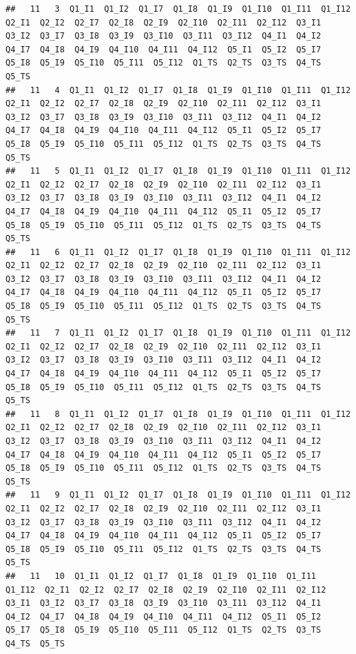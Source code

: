 \documentclass[
]{book}
\begin{document}
\begin{verbatim}
##   11   3  Q1_I1  Q1_I2  Q1_I7  Q1_I8  Q1_I9  Q1_I10  Q1_I11  Q1_I12  Q2_I1  Q2_I2  Q2_I7  Q2_I8  Q2_I9  Q2_I10  Q2_I11  Q2_I12  Q3_I1  Q3_I2  Q3_I7  Q3_I8  Q3_I9  Q3_I10  Q3_I11  Q3_I12  Q4_I1  Q4_I2  Q4_I7  Q4_I8  Q4_I9  Q4_I10  Q4_I11  Q4_I12  Q5_I1  Q5_I2  Q5_I7  Q5_I8  Q5_I9  Q5_I10  Q5_I11  Q5_I12  Q1_TS  Q2_TS  Q3_TS  Q4_TS  Q5_TS
##   11   4  Q1_I1  Q1_I2  Q1_I7  Q1_I8  Q1_I9  Q1_I10  Q1_I11  Q1_I12  Q2_I1  Q2_I2  Q2_I7  Q2_I8  Q2_I9  Q2_I10  Q2_I11  Q2_I12  Q3_I1  Q3_I2  Q3_I7  Q3_I8  Q3_I9  Q3_I10  Q3_I11  Q3_I12  Q4_I1  Q4_I2  Q4_I7  Q4_I8  Q4_I9  Q4_I10  Q4_I11  Q4_I12  Q5_I1  Q5_I2  Q5_I7  Q5_I8  Q5_I9  Q5_I10  Q5_I11  Q5_I12  Q1_TS  Q2_TS  Q3_TS  Q4_TS  Q5_TS
##   11   5  Q1_I1  Q1_I2  Q1_I7  Q1_I8  Q1_I9  Q1_I10  Q1_I11  Q1_I12  Q2_I1  Q2_I2  Q2_I7  Q2_I8  Q2_I9  Q2_I10  Q2_I11  Q2_I12  Q3_I1  Q3_I2  Q3_I7  Q3_I8  Q3_I9  Q3_I10  Q3_I11  Q3_I12  Q4_I1  Q4_I2  Q4_I7  Q4_I8  Q4_I9  Q4_I10  Q4_I11  Q4_I12  Q5_I1  Q5_I2  Q5_I7  Q5_I8  Q5_I9  Q5_I10  Q5_I11  Q5_I12  Q1_TS  Q2_TS  Q3_TS  Q4_TS  Q5_TS
##   11   6  Q1_I1  Q1_I2  Q1_I7  Q1_I8  Q1_I9  Q1_I10  Q1_I11  Q1_I12  Q2_I1  Q2_I2  Q2_I7  Q2_I8  Q2_I9  Q2_I10  Q2_I11  Q2_I12  Q3_I1  Q3_I2  Q3_I7  Q3_I8  Q3_I9  Q3_I10  Q3_I11  Q3_I12  Q4_I1  Q4_I2  Q4_I7  Q4_I8  Q4_I9  Q4_I10  Q4_I11  Q4_I12  Q5_I1  Q5_I2  Q5_I7  Q5_I8  Q5_I9  Q5_I10  Q5_I11  Q5_I12  Q1_TS  Q2_TS  Q3_TS  Q4_TS  Q5_TS
##   11   7  Q1_I1  Q1_I2  Q1_I7  Q1_I8  Q1_I9  Q1_I10  Q1_I11  Q1_I12  Q2_I1  Q2_I2  Q2_I7  Q2_I8  Q2_I9  Q2_I10  Q2_I11  Q2_I12  Q3_I1  Q3_I2  Q3_I7  Q3_I8  Q3_I9  Q3_I10  Q3_I11  Q3_I12  Q4_I1  Q4_I2  Q4_I7  Q4_I8  Q4_I9  Q4_I10  Q4_I11  Q4_I12  Q5_I1  Q5_I2  Q5_I7  Q5_I8  Q5_I9  Q5_I10  Q5_I11  Q5_I12  Q1_TS  Q2_TS  Q3_TS  Q4_TS  Q5_TS
##   11   8  Q1_I1  Q1_I2  Q1_I7  Q1_I8  Q1_I9  Q1_I10  Q1_I11  Q1_I12  Q2_I1  Q2_I2  Q2_I7  Q2_I8  Q2_I9  Q2_I10  Q2_I11  Q2_I12  Q3_I1  Q3_I2  Q3_I7  Q3_I8  Q3_I9  Q3_I10  Q3_I11  Q3_I12  Q4_I1  Q4_I2  Q4_I7  Q4_I8  Q4_I9  Q4_I10  Q4_I11  Q4_I12  Q5_I1  Q5_I2  Q5_I7  Q5_I8  Q5_I9  Q5_I10  Q5_I11  Q5_I12  Q1_TS  Q2_TS  Q3_TS  Q4_TS  Q5_TS
##   11   9  Q1_I1  Q1_I2  Q1_I7  Q1_I8  Q1_I9  Q1_I10  Q1_I11  Q1_I12  Q2_I1  Q2_I2  Q2_I7  Q2_I8  Q2_I9  Q2_I10  Q2_I11  Q2_I12  Q3_I1  Q3_I2  Q3_I7  Q3_I8  Q3_I9  Q3_I10  Q3_I11  Q3_I12  Q4_I1  Q4_I2  Q4_I7  Q4_I8  Q4_I9  Q4_I10  Q4_I11  Q4_I12  Q5_I1  Q5_I2  Q5_I7  Q5_I8  Q5_I9  Q5_I10  Q5_I11  Q5_I12  Q1_TS  Q2_TS  Q3_TS  Q4_TS  Q5_TS
##   11   10  Q1_I1  Q1_I2  Q1_I7  Q1_I8  Q1_I9  Q1_I10  Q1_I11  Q1_I12  Q2_I1  Q2_I2  Q2_I7  Q2_I8  Q2_I9  Q2_I10  Q2_I11  Q2_I12  Q3_I1  Q3_I2  Q3_I7  Q3_I8  Q3_I9  Q3_I10  Q3_I11  Q3_I12  Q4_I1  Q4_I2  Q4_I7  Q4_I8  Q4_I9  Q4_I10  Q4_I11  Q4_I12  Q5_I1  Q5_I2  Q5_I7  Q5_I8  Q5_I9  Q5_I10  Q5_I11  Q5_I12  Q1_TS  Q2_TS  Q3_TS  Q4_TS  Q5_TS

\end{verbatim}
\end{document}
